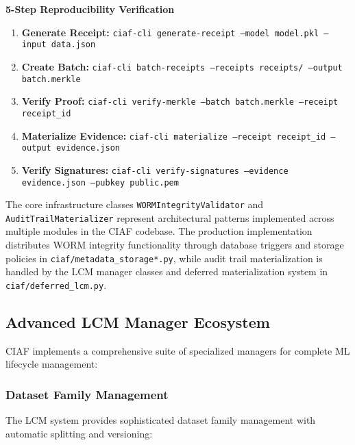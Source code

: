 \documentclass[12pt,a4paper]{article}
\begin{document}
\begin{infobox}
\textbf{5-Step Reproducibility Verification}
\begin{enumerate}
\item \textbf{Generate Receipt:} \texttt{ciaf-cli generate-receipt --model model.pkl --input data.json}
\item \textbf{Create Batch:} \texttt{ciaf-cli batch-receipts --receipts receipts/ --output batch.merkle}
\item \textbf{Verify Proof:} \texttt{ciaf-cli verify-merkle --batch batch.merkle --receipt receipt\_id}
\item \textbf{Materialize Evidence:} \texttt{ciaf-cli materialize --receipt receipt\_id --output evidence.json}
\item \textbf{Verify Signatures:} \texttt{ciaf-cli verify-signatures --evidence evidence.json --pubkey public.pem}
\end{enumerate}
\end{infobox}

\begin{tcolorbox}[colframe=blue!70, colback=green!8, title={\textbf{Implementation Note}}]
The core infrastructure classes \texttt{WORMIntegrityValidator} and \texttt{AuditTrailMaterializer} represent architectural patterns implemented across multiple modules in the CIAF codebase. The production implementation distributes WORM integrity functionality through database triggers and storage policies in \texttt{ciaf/metadata\_storage*.py}, while audit trail materialization is handled by the LCM manager classes and deferred materialization system in \texttt{ciaf/deferred\_lcm.py}.
\end{tcolorbox}

\subsection{Advanced LCM Manager Ecosystem}

CIAF implements a comprehensive suite of specialized managers for complete ML lifecycle management:

\subsubsection{Dataset Family Management}

The LCM system provides sophisticated dataset family management with automatic splitting and versioning:
\end{document}
